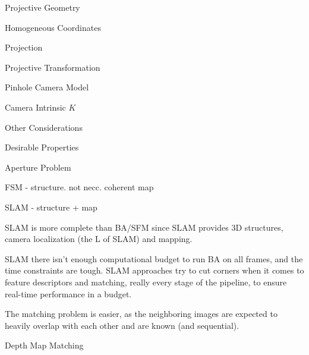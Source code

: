 \begin{section}
\begin{subsubsection}
\begin{subsubsection}
\begin{subsubsection}
\begin{section}{Projective Geometry}
\begin{subsection}{Homogeneous Coordinates}
\begin{subsubsection}
{\begin{subsubsection}{Projection}
\begin{subsubsection}{Projective Transformation}
\begin{subsection}
\begin{subsubsection}
\begin{subsubsection}
\begin{subsubsection}
{\begin{subsubsection}
\begin{subsection}
\begin{subsection} {Pinhole Camera Model}
\begin{subsection} {Camera Intrinsic $K$}
\begin{subsection}
\begin{subsection}
\begin{subsubsection}{Other Considerations}
{\begin{subsection}
\begin{subsubsection}{Desirable Properties}
\begin{section}
\begin{subsection}
\begin{subsection}
\begin{subsection}
\begin{section}
\begin{subsection}
\begin{subsubsection}
\begin{subsubsection}
\begin{subsection}
\begin{section}
\begin{subsection}
\begin{subsubsection}{Aperture Problem}
\begin{subsubsection}
{\begin{section}
\begin{subsubsection}
\begin{subsubsection}
\begin{subsubsection}
\begin{subsection}
\begin{subsection}
\begin{subsection}
\begin{subsection}
\begin{subsection}
\begin{subsection}
\begin{subsection}
\begin{subsubsection}
{\begin{subsubsection}
{\begin{subsubsection}
\begin{section}
\begin{section}
\begin{section}
FSM - structure. not necc. coherent map

SLAM - structure + map

SLAM is more complete than BA/SFM since SLAM provides 3D structures, camera localization (the L of SLAM) and mapping.

SLAM there isn’t enough computational budget to run BA on all frames, and the time constraints are tough. SLAM approaches try to cut corners when it comes to feature descriptors and matching, really every stage of the pipeline, to ensure real-time performance in a budget. 

The matching problem is easier, as the  neighboring images are expected to heavily overlap with each other and are known (and sequential).

\begin{subsubsection} Depth Map Matching


\end{subsubsection}
\end{section}
\end{section}
\end{section}
\end{subsubsection}}
\end{subsubsection}}
\end{subsubsection}
\end{subsection}
\end{subsection}
\end{subsection}
\end{subsection}
\end{subsection}
\end{subsection}
\end{subsection}
\end{subsubsection}
\end{subsubsection}
\end{subsubsection}
\end{section}}
\end{subsubsection}
\end{subsubsection}
\end{subsection}
\end{section}
\end{subsection}
\end{subsubsection}
\end{subsubsection}
\end{subsection}
\end{section}
\end{subsection}
\end{subsection}
\end{subsection}
\end{section}
\end{subsubsection}
\end{subsection}}
\end{subsubsection}
\end{subsection}
\end{subsection}
\end{subsection}
\end{subsection}
\end{subsection}
\end{subsubsection}}
\end{subsubsection}
\end{subsubsection}
\end{subsubsection}
\end{subsection}
\end{subsubsection}
\end{subsubsection}}
\end{subsubsection}
\end{subsection}
\end{section}
\end{subsubsection}
\end{subsubsection}
\end{subsubsection}
\end{section}
